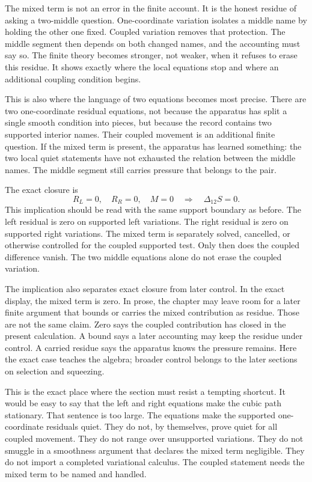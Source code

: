 The mixed term is not an error in the finite account. It is the honest residue
of asking a two-middle question. One-coordinate variation isolates a middle
name by holding the other one fixed. Coupled variation removes that protection.
The middle segment then depends on both changed names, and the accounting must
say so. The finite theory becomes stronger, not weaker, when it refuses to
erase this residue. It shows exactly where the local equations stop and where
an additional coupling condition begins.

This is also where the language of two equations becomes most precise. There
are two one-coordinate residual equations, not because the apparatus has split
a single smooth condition into pieces, but because the record contains two
supported interior names. Their coupled movement is an additional finite
question. If the mixed term is present, the apparatus has learned something:
the two local quiet statements have not exhausted the relation between the
middle names. The middle segment still carries pressure that belongs to the
pair.

The exact closure is
\[
  R_L=0,\quad R_R=0,\quad M=0
    \quad\Longrightarrow\quad
    \Delta_{12}S=0.
\]
This implication should be read with the same support boundary as before. The
left residual is zero on supported left variations. The right residual is zero
on supported right variations. The mixed term is separately solved, cancelled,
or otherwise controlled for the coupled supported test. Only then does the
coupled difference vanish. The two middle equations alone do not erase the
coupled variation.

The implication also separates exact closure from later control. In the exact display, the mixed term is zero. In prose, the chapter may leave room for a
later finite argument that bounds or carries the mixed contribution as
residue. Those are not the same claim. Zero says the coupled contribution has
closed in the present calculation. A bound says a later accounting may keep
the residue under control. A carried residue says the apparatus knows the
pressure remains. Here the exact case teaches the algebra; broader control
belongs to the later sections on selection and squeezing.

This is the exact place where the section must resist a tempting shortcut. It
would be easy to say that the left and right equations make the cubic path
stationary. That sentence is too large. The equations make the supported
one-coordinate residuals quiet. They do not, by themselves, prove quiet for
all coupled movement. They do not range over unsupported variations. They do
not smuggle in a smoothness argument that declares the mixed term negligible.
They do not import a completed variational calculus. The coupled statement
needs the mixed term to be named and handled.

